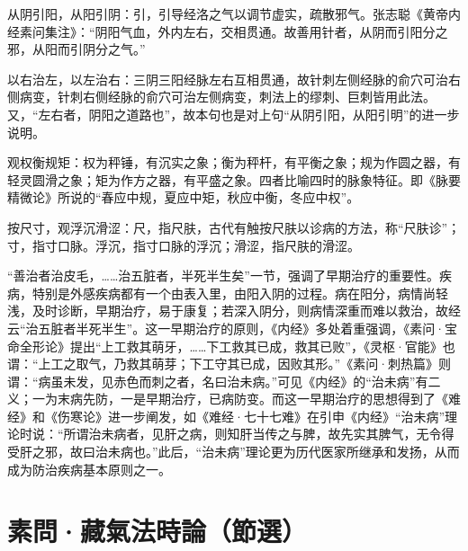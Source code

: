 \documentclass[12pt]{ctexbook}
\begin{document}
\begin{jiaozhu}
	\item 从阴引阳，从阳引阴：引，引导经洛之气以调节虚实，疏散邪气。张志聪《黄帝内经素问集注》：“阴阳气血，外内左右，交相贯通。故善用针者，从阴而引阳分之邪，从阳而引阴分之气。”
	\item 以右治左，以左治右：三阴三阳经脉左右互相贯通，故针刺左侧经脉的俞穴可治右侧病变，针刺右侧经脉的俞穴可治左侧病变，刺法上的缪刺、巨刺皆用此法。又，“左右者，阴阳之道路也”，故本句也是对上句“从阴引阳，从阳引明”的进一步说明。
	\item 观权衡规矩：权为秤锤，有沉实之象；衡为秤杆，有平衡之象；规为作圆之器，有轻灵圆滑之象；矩为作方之器，有平盛之象。四者比喻四时的脉象特征。即《脉要精微论》所说的“春应中规，夏应中矩，秋应中衡，冬应中权”。
	\item 按尺寸，观浮沉滑涩：尺，指尺肤，古代有触按尺肤以诊病的方法，称“尺肤诊”；寸，指寸口脉。浮沉，指寸口脉的浮沉；滑涩，指尺肤的滑涩。
\end{jiaozhu}



“善治者治皮毛，……治五脏者，半死半生矣”一节，强调了早期治疗的重要性。疾病，特别是外感疾病都有一个由表入里，由阳入阴的过程。病在阳分，病情尚轻浅，及时诊断，早期治疗，易于康复；若深入阴分，则病情深重而难以救治，故经云“治五脏者半死半生”。这一早期治疗的原则，《内经》多处着重强调，《素问·宝命全形论》提出“上工救其萌牙，……下工救其已成，救其已败”，《灵枢·官能》也谓：“上工之取气，乃救其萌芽；下工守其已成，因败其形。”《素问·刺热篇》则谓：“病虽未发，见赤色而刺之者，名曰治未病。”可见《内经》的“治未病”有二义；一为末病先防，一是早期治疗，已病防变。而这一早期治疗的思想得到了《难经》和《伤寒论》进一步阐发，如《难经·七十七难》在引申《内经》“治未病”理论时说：“所谓治未病者，见肝之病，则知肝当传之与脾，故先实其脾气，无令得受肝之邪，故曰治未病也。”此后，“治未病”理论更为历代医家所继承和发扬，从而成为防治疾病基本原则之一。

\section{素問·藏氣法時論（節選）}%

\end{document}
